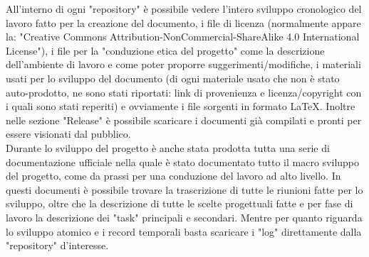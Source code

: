 \documentclass[hidelinks,12pt,a4paper]{article}
\begin{document}
\begin{flushleft}
				 All'interno di ogni "repository" è possibile vedere l'intero sviluppo cronologico del lavoro fatto per la creazione del documento,  i file di licenza (normalmente appare la: "Creative Commons Attribution-NonCommercial-ShareAlike 4.0 International License"), i file per la "conduzione etica del progetto" come la descrizione dell'ambiente di lavoro e come poter proporre suggerimenti/modifiche, i materiali usati per lo sviluppo del documento (di ogni materiale usato che non è stato auto-prodotto, ne sono stati riportati: link di provenienza e licenza/copyright con i quali sono stati reperiti) e ovviamente i file sorgenti in formato \LaTeX. Inoltre nelle sezione "Release" è possibile scaricare i documenti già compilati e pronti per essere visionati dal pubblico.\\
				 Durante lo sviluppo del progetto è anche stata prodotta tutta una serie di documentazione ufficiale nella quale è stato documentato tutto il macro sviluppo del progetto, come da prassi per una conduzione del lavoro ad alto livello. In questi documenti è possibile trovare la trascrizione di tutte le riunioni fatte per lo sviluppo, oltre che la descrizione di tutte le scelte progettuali fatte e per fase di lavoro la descrizione dei "task" principali e secondari. Mentre per quanto riguarda lo sviluppo atomico e i record temporali basta scaricare i "log" direttamente dalla "repository" d'interesse.


\end{flushleft}
\end{document}
